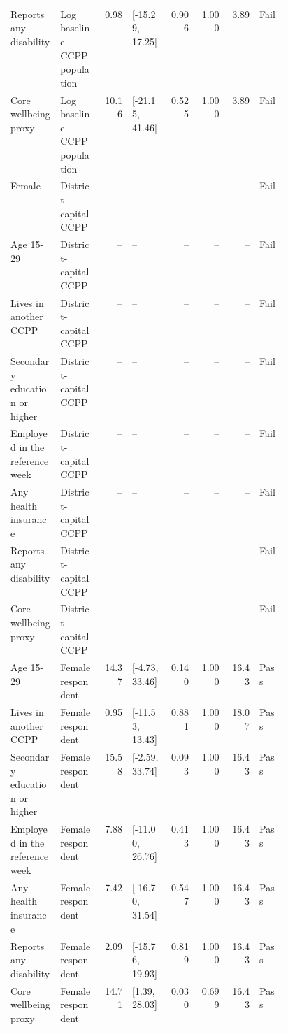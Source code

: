 \begin{longtable}{@{}p{0.18\linewidth}p{0.15\linewidth}rp{0.13\linewidth}rrrl@{}}
Reports any disability & Log baseline CCPP population & 0.98 & [-15.29, 17.25] & 0.906 & 1.000 & 3.89 & Fail \\
Core wellbeing proxy & Log baseline CCPP population & 10.16 & [-21.15, 41.46] & 0.525 & 1.000 & 3.89 & Fail \\
Female & District-capital CCPP & -- & -- & -- & -- & -- & Fail \\
Age 15-29 & District-capital CCPP & -- & -- & -- & -- & -- & Fail \\
Lives in another CCPP & District-capital CCPP & -- & -- & -- & -- & -- & Fail \\
Secondary education or higher & District-capital CCPP & -- & -- & -- & -- & -- & Fail \\
Employed in the reference week & District-capital CCPP & -- & -- & -- & -- & -- & Fail \\
Any health insurance & District-capital CCPP & -- & -- & -- & -- & -- & Fail \\
Reports any disability & District-capital CCPP & -- & -- & -- & -- & -- & Fail \\
Core wellbeing proxy & District-capital CCPP & -- & -- & -- & -- & -- & Fail \\
Age 15-29 & Female respondent & 14.37 & [-4.73, 33.46] & 0.140 & 1.000 & 16.43 & Pass \\
Lives in another CCPP & Female respondent & 0.95 & [-11.53, 13.43] & 0.881 & 1.000 & 18.07 & Pass \\
Secondary education or higher & Female respondent & 15.58 & [-2.59, 33.74] & 0.093 & 1.000 & 16.43 & Pass \\
Employed in the reference week & Female respondent & 7.88 & [-11.00, 26.76] & 0.413 & 1.000 & 16.43 & Pass \\
Any health insurance & Female respondent & 7.42 & [-16.70, 31.54] & 0.547 & 1.000 & 16.43 & Pass \\
Reports any disability & Female respondent & 2.09 & [-15.76, 19.93] & 0.819 & 1.000 & 16.43 & Pass \\
Core wellbeing proxy & Female respondent & 14.71 & [1.39, 28.03] & 0.030 & 0.699 & 16.43 & Pass \\
\end{longtable}
\endgroup
